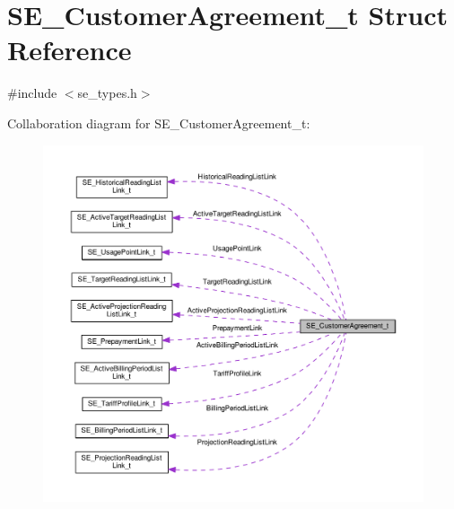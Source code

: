 \hypertarget{structSE__CustomerAgreement__t}{}\section{S\+E\+\_\+\+Customer\+Agreement\+\_\+t Struct Reference}
\label{structSE__CustomerAgreement__t}


{\ttfamily \#include $<$se\+\_\+types.\+h$>$}



Collaboration diagram for S\+E\+\_\+\+Customer\+Agreement\+\_\+t\+:\nopagebreak
\begin{figure}[H]
\begin{center}
\leavevmode
\includegraphics[width=350pt]{structSE__CustomerAgreement__t__coll__graph}
\end{center}
\end{figure}
